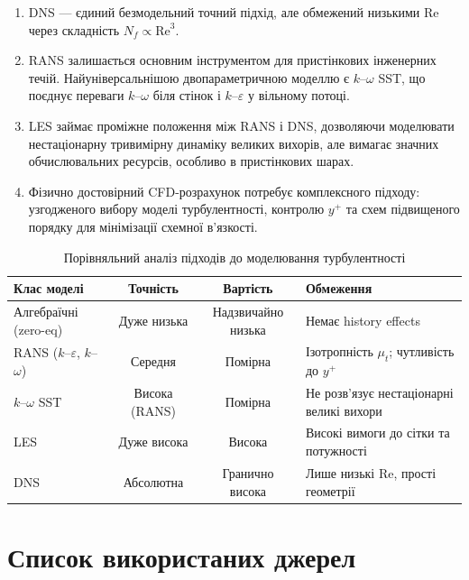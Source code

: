 \documentclass[14pt,a4paper,extarticle]{extarticle}
\newcommand{\Rey}{\mathrm{Re}}
\begin{document}
\begin{enumerate}
  \item DNS --- єдиний безмодельний точний підхід, але обмежений низькими
        $\Rey$ через складність $N_f \propto \Rey^3$.
  \item RANS залишається основним інструментом для пристінкових інженерних
        течій. Найуніверсальнішою двопараметричною моделлю є $k$--$\omega$ SST,
        що поєднує переваги $k$--$\omega$ біля стінок і $k$--$\varepsilon$
        у вільному потоці.
  \item LES займає проміжне положення між RANS і DNS, дозволяючи моделювати
        нестаціонарну тривимірну динаміку великих вихорів, але вимагає
        значних обчислювальних ресурсів, особливо в пристінкових шарах.
  \item Фізично достовірний CFD-розрахунок потребує комплексного підходу:
        узгодженого вибору моделі турбулентності, контролю $y^+$ та схем
        підвищеного порядку для мінімізації схемної в'язкості.
\end{enumerate}

\begin{table}[H]
  \caption{Порівняльний аналіз підходів до моделювання турбулентності}
  \label{tab:compare}
  \centering
  \small
  \renewcommand{\arraystretch}{1.2}
  \begin{tabular}{|p{3.1cm}|c|c|p{4.2cm}|}
    \hline
    Клас моделі & Точність & Вартість & Обмеження \\
    \hline
    Алгебраїчні (zero-eq) & Дуже низька & Надзвичайно низька &
      Немає history effects \\
    \hline
    RANS ($k$--$\varepsilon$, $k$--$\omega$) & Середня & Помірна &
      Ізотропність $\mu_t$; чутливість до $y^+$ \\
    \hline
    $k$--$\omega$ SST & Висока (RANS) & Помірна &
      Не розв'язує нестаціонарні великі вихори \\
    \hline
    LES & Дуже висока & Висока &
      Високі вимоги до сітки та потужності \\
    \hline
    DNS & Абсолютна & Гранично висока &
      Лише низькі $\Rey$, прості геометрії \\
    \hline
  \end{tabular}
\end{table}

\section*{Список використаних джерел}
\end{document}
